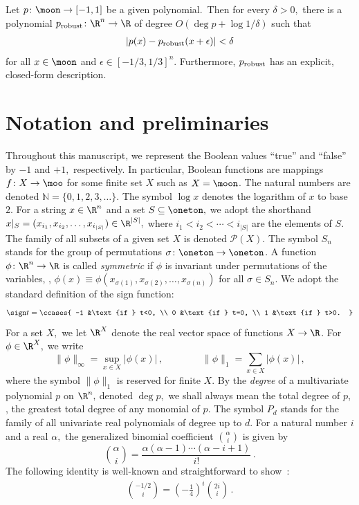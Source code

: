 \begin{theorem}
\label{thm:main}
Let $p\colon\moon\to[-1,1]$ be a given polynomial.\ Then
for every $\delta>0,$ there is a polynomial $p_\text{\rm
robust}\colon\R^n\to\R$ of
degree $O(\deg p+\log 1/\delta)$ such that 
\begin{align*}
   \left|p(x) - p_\text{\rm robust}(x+\epsilon)\right| <\delta
\end{align*}
for all $x\in\moon$ and $\epsilon\in[-1/3,1/3]^n$.
Furthermore, $p_\text{\rm robust}$ has an explicit, closed-form
description.
\end{theorem}

\section{Notation and preliminaries}
\label{sec:prelim}

Throughout this manuscript, we represent the Boolean
values ``true'' and ``false'' by $-1$ and $+1,$
respectively. In particular, Boolean functions are
mappings $f\colon X\to\moo$ for some finite set $X$
such as $X=\moon$. The natural numbers are denoted
$\mathbb N=\{0,1,2,3,\dots\}$. The symbol $\log x$
denotes the logarithm of $x$ to base~$2$.
For a string $x\in\R^n$ and a set $S\subseteq\oneton,$
we adopt the shorthand
$x|_S=(x_{i_1},x_{i_2},\dots,x_{i_{|S|}})\in\R^{|S|},$
where $i_1<i_2<\cdots<i_{|S|}$ are the elements of $S$. 
The family of all subsets of a given set $X$ is denoted
$\mathcal{P}(X)$. The symbol $S_n$ stands for the group
of permutations $\sigma\colon\oneton\to\oneton$. A
function
$\phi\colon\R^n\to\R$ is called \emph{symmetric}
if $\phi$ is invariant under permutations of the
variables, \ie, $\phi(x)\equiv
\phi(x_{\sigma(1)},x_{\sigma(2)},\dots,x_{\sigma(n)})$
for all $\sigma\in S_n$. 
We adopt the standard definition
of the sign function:
\begin{align*}
  \sign t = 
  \ccases{
  -1 &\text{if } t<0, \\
  0  &\text{if } t=0, \\
  1 &\text{if } t>0.
  }
\end{align*}
For a set $X,$ we let $\R^X$ denote the real vector
space of functions $X\to\R$. For $\phi\in\R^X,$ 
we write
\[
\|\phi\|_\infty =\sup_{x\in X} |\phi(x)|\,, 
\qquad\qquad \|\phi\|_1=\sum_{x\in X} |\phi(x)|\,,
\]
where the symbol $\|\phi\|_1$ is reserved for finite
$X$. By the \emph{degree} of a multivariate polynomial $p$
on $\R^n,$ denoted $\deg p,$ we shall always mean the
total degree of $p$, \ie, the greatest total degree of
any monomial of $p$. The symbol $P_d$ stands for the
family of all univariate real polynomials of degree up
to $d$. 
For a natural number $i$ and a real $\alpha,$ the
generalized binomial coefficient ${\alpha\choose i}$ is
given by \[{\alpha\choose
i}=\frac{\alpha(\alpha-1)\cdots(\alpha-i+1)}{i!}\,.\]
The following identity is well-known and straightforward to
show~\cite[p.~186]{concrete-math}:
\begin{align}
{-1/2\choose i}=\left(-\frac14\right)^i{2i\choose i}\,.
\label{eqn:gen-binom}
\end{align}


